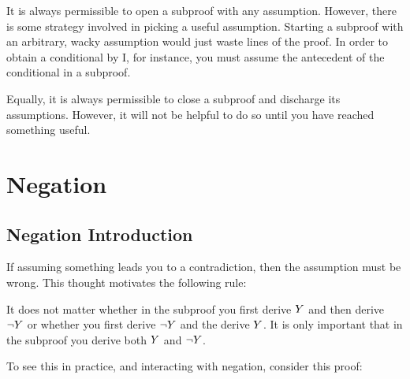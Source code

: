 It is always permissible to open a subproof with any assumption. However, there is some strategy involved in picking a useful assumption. Starting a subproof with an arbitrary, wacky assumption would just waste lines of the proof. In order to obtain a conditional by {\eif}I, for instance, you must assume the antecedent of the conditional in a subproof.

Equally, it is always permissible to close a subproof and discharge its assumptions. However, it will not be helpful to do so until you have reached something useful.


\section{Negation}
\subsection{Negation Introduction}
If assuming something leads you to a contradiction, then the assumption must be wrong. 
This thought motivates the following rule:
\begin{highlighted}\begin{fitchproof}
		\open
		\ellipsesline
		\close
\end{fitchproof}\end{highlighted}
It does not matter whether in the subproof you first derive $Y$ and then derive $\neg Y$ or whether you first derive $\neg Y$ and the derive $Y$. It is only important that in the subproof you derive both $Y$ and $\neg Y$.

To see this in practice, and interacting with negation, consider this proof:

\begin{fitchproof}
	\open
	\close
\end{fitchproof}





